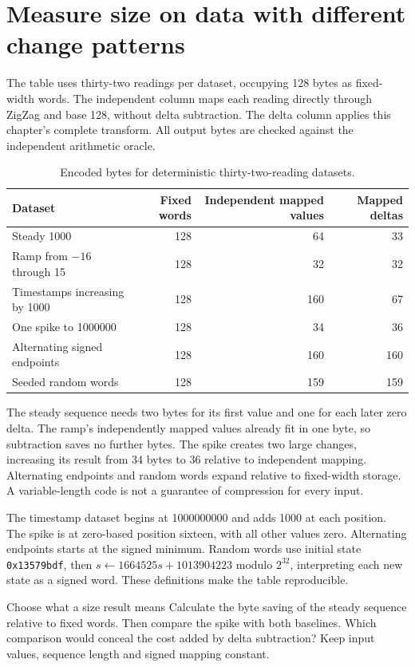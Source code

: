 \section{Measure size on data with different change patterns}
The table uses thirty-two readings per dataset, occupying 128 bytes as fixed-width
words. The independent column maps each reading directly through ZigZag and base 128,
without delta subtraction. The delta column applies this chapter's complete transform.
All output bytes are checked against the independent arithmetic oracle.
\begin{table}[htbp]
  \centering
  \caption{Encoded bytes for deterministic thirty-two-reading datasets.}
  \begin{tabular}{lrrr}
    \toprule
    Dataset                       & Fixed words & Independent mapped values & Mapped deltas \\
    \midrule
    Steady 1000                   & 128         & 64                        & 33            \\
    Ramp from \(-16\) through 15  & 128         & 32                        & 32            \\
    Timestamps increasing by 1000 & 128         & 160                       & 67            \\
    One spike to 1000000          & 128         & 34                        & 36            \\
    Alternating signed endpoints  & 128         & 160                       & 160           \\
    Seeded random words           & 128         & 159                       & 159           \\
    \bottomrule
  \end{tabular}
\end{table}

The steady sequence needs two bytes for its first value and one for each later zero
delta. The ramp's independently mapped values already fit in one byte, so subtraction
saves no further bytes. The spike creates two large changes, increasing its result from
34 bytes to 36 relative to independent mapping. Alternating endpoints and random words
expand relative to fixed-width storage. A variable-length code is not a guarantee of
compression for every input.

The timestamp dataset begins at 1000000000 and adds 1000 at each position. The spike
is at zero-based position sixteen, with all other values zero. Alternating endpoints
starts at the signed minimum. Random words use initial state \texttt{0x13579bdf},
then \(s\gets1664525s+1013904223\) modulo \(2^{32}\), interpreting each new state
as a signed word. These definitions make the table reproducible.

\begin{MARSExercise}{Choose what a size result means}
  Calculate the byte saving of the steady sequence relative to fixed words. Then compare
  the spike with both baselines. Which comparison would conceal the cost added by delta
  subtraction? Keep input values, sequence length and signed mapping constant.
\end{MARSExercise}

